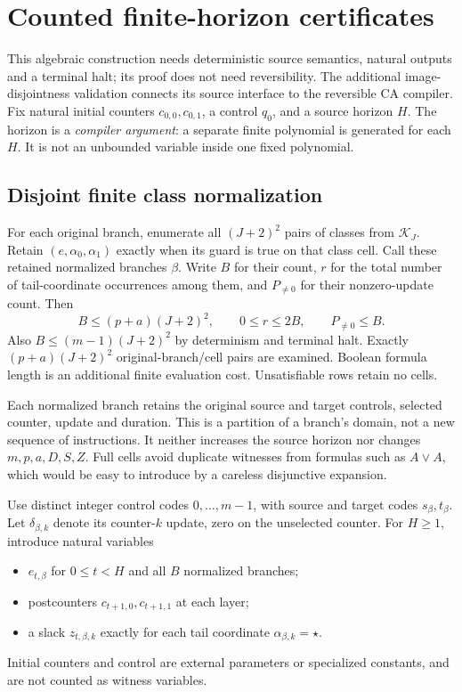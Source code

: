 \documentclass[11pt,a4paper]{article}
\numberwithin{equation}{section}
\begin{document}
\section{Counted finite-horizon certificates}\label{fpa:sec:certificates}
This algebraic construction needs deterministic source semantics, natural
outputs and a terminal halt; its proof does not need reversibility. The
additional image-disjointness validation connects its source interface to the
reversible CA compiler. Fix natural initial counters $c_{0,0},c_{0,1}$, a
control $q_0$, and a source horizon $H$. The horizon is a \emph{compiler
argument}: a separate finite polynomial is generated for each $H$. It is not
an unbounded variable inside one fixed polynomial.

\subsection{Disjoint finite class normalization}
For each original branch, enumerate all $(J+2)^2$ pairs of classes from
$\mathcal K_J$. Retain $(e,\alpha_0,\alpha_1)$ exactly when its guard is true
on that class cell. Call these retained normalized branches $\beta$. Write
$B$ for their count, $r$ for the total number of tail-coordinate occurrences
among them, and $P_{\ne0}$ for their nonzero-update count. Then
\[
 B\le(p+a)(J+2)^2,\qquad 0\le r\le2B,\qquad P_{\ne0}\le B.
                                                               \tag{21}
\]
Also $B\le(m-1)(J+2)^2$ by determinism and terminal halt. Exactly
$(p+a)(J+2)^2$ original-branch/cell pairs are examined. Boolean formula
length is an additional finite evaluation cost. Unsatisfiable rows retain no
cells.

Each normalized branch retains the original source and target controls,
selected counter, update and duration. This is a partition of a branch's
domain, not a new sequence of instructions. It neither increases the source
horizon nor changes $m,p,a,D,S,Z$. Full cells avoid duplicate witnesses from
formulas such as $A\lor A$, which would be easy to introduce by a careless
disjunctive expansion.

Use distinct integer control codes $0,\ldots,m-1$, with source and target
codes $s_\beta,t_\beta$. Let $\delta_{\beta,k}$ denote its counter-$k$ update,
zero on the unselected counter. For $H\ge1$, introduce natural variables
\begin{itemize}
\item $e_{t,\beta}$ for $0\le t<H$ and all $B$ normalized branches;
\item postcounters $c_{t+1,0},c_{t+1,1}$ at each layer;
\item a slack $z_{t,\beta,k}$ exactly for each tail coordinate
$\alpha_{\beta,k}=\star$.
\end{itemize}
Initial counters and control are external parameters or specialized constants,
and are not counted as witness variables.
\end{document}
